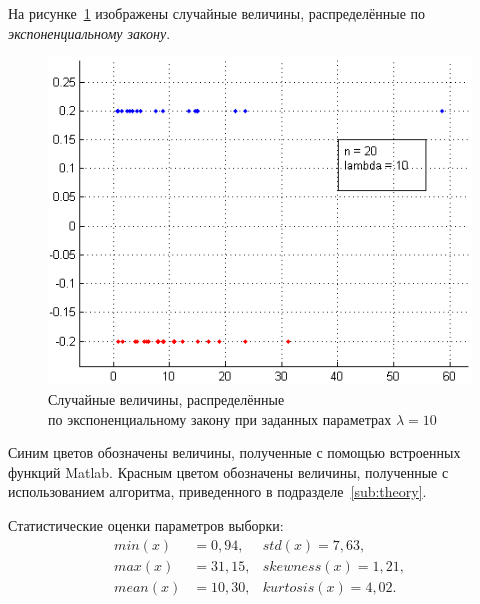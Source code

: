 На рисунке~\ref{pic:exp} изображены случайные величины, распределённые
по \textit{экспоненциальному закону}.
\begin{figure}[h!]
  \centering
  \includegraphics[width=0.9\linewidth]{pic/exp}
  \caption{Случайные величины, распределённые \\ по экспоненциальному закону при заданных параметрах $ \lambda = 10 $}
  \label{pic:exp}
\end{figure}

Синим цветов обозначены величины, полученные с помощью
встроенных функций Matlab. Красным цветом обозначены величины, полученные
с использованием алгоритма, приведенного в подразделе~\ref{sub:theory}.

Статистические оценки параметров выборки:
\begin{align*}
  min (x)  &= 0,94,  & std (x) = 7,63, \\
  max (x)  &= 31,15, & skewness (x) = 1,21, \\
  mean (x) &= 10,30, & kurtosis (x) = 4,02.
\end{align*}

\newpage
